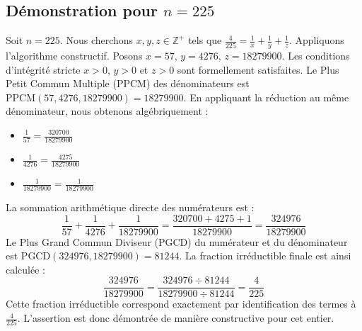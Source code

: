 \documentclass[11pt,a4paper]{article}
\begin{document}
\subsection{Démonstration pour $n = 225$}
Soit $n = 225$. Nous cherchons $x, y, z \in \mathbb{Z}^{+}$ tels que $\frac{4}{225} = \frac{1}{x} + \frac{1}{y} + \frac{1}{z}$.
Appliquons l'algorithme constructif. Posons $x = 57$, $y = 4276$, $z = 18279900$.
Les conditions d'intégrité stricte $x > 0$, $y > 0$ et $z > 0$ sont formellement satisfaites.
Le Plus Petit Commun Multiple (PPCM) des dénominateurs est $\text{PPCM}(57, 4276, 18279900) = 18279900$.
En appliquant la réduction au même dénominateur, nous obtenons algébriquement :
\begin{itemize}
    \item $\frac{1}{57} = \frac{320700}{18279900}$
    \item $\frac{1}{4276} = \frac{4275}{18279900}$
    \item $\frac{1}{18279900} = \frac{1}{18279900}$
\end{itemize}
La sommation arithmétique directe des numérateurs est :
$$ \frac{1}{57} + \frac{1}{4276} + \frac{1}{18279900} = \frac{320700 + 4275 + 1}{18279900} = \frac{324976}{18279900} $$
Le Plus Grand Commun Diviseur (PGCD) du numérateur et du dénominateur est $\text{PGCD}(324976, 18279900) = 81244$.
La fraction irréductible finale est ainsi calculée :
$$ \frac{324976}{18279900} = \frac{324976 \div 81244}{18279900 \div 81244} = \frac{4}{225} $$
Cette fraction irréductible correspond exactement par identification des termes à $\frac{4}{225}$. L'assertion est donc démontrée de manière constructive pour cet entier.
\end{document}

